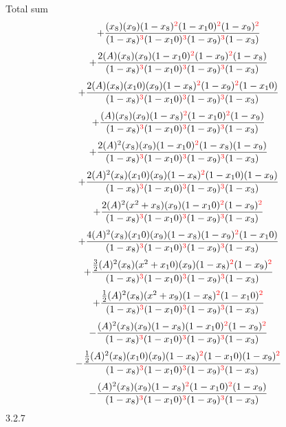 \documentclass{article}
\begin{document}
Total sum
\[+\frac{(x_8)(x_9)(1-x_8)^{\textcolor{red}{2}}(1-x_10)^{\textcolor{red}{2}}(1-x_9)^{\textcolor{red}{2}}}{(1-x_8)^{\textcolor{red}{3}}(1-x_10)^{\textcolor{red}{3}}(1-x_9)^{\textcolor{red}{3}}(1-x_3)}\]\[+\frac{2(A)(x_8)(x_9)(1-x_10)^{\textcolor{red}{2}}(1-x_9)^{\textcolor{red}{2}}(1-x_8)}{(1-x_8)^{\textcolor{red}{3}}(1-x_10)^{\textcolor{red}{3}}(1-x_9)^{\textcolor{red}{3}}(1-x_3)}\]\[+\frac{2(A)(x_8)(x_10)(x_9)(1-x_8)^{\textcolor{red}{2}}(1-x_9)^{\textcolor{red}{2}}(1-x_10)}{(1-x_8)^{\textcolor{red}{3}}(1-x_10)^{\textcolor{red}{3}}(1-x_9)^{\textcolor{red}{3}}(1-x_3)}\]\[+\frac{(A)(x_8)(x_9)(1-x_8)^{\textcolor{red}{2}}(1-x_10)^{\textcolor{red}{2}}(1-x_9)}{(1-x_8)^{\textcolor{red}{3}}(1-x_10)^{\textcolor{red}{3}}(1-x_9)^{\textcolor{red}{3}}(1-x_3)}\]\[+\frac{2(A)^{2}(x_8)(x_9)(1-x_10)^{\textcolor{red}{2}}(1-x_8)(1-x_9)}{(1-x_8)^{\textcolor{red}{3}}(1-x_10)^{\textcolor{red}{3}}(1-x_9)^{\textcolor{red}{3}}(1-x_3)}\]\[+\frac{2(A)^{2}(x_8)(x_10)(x_9)(1-x_8)^{\textcolor{red}{2}}(1-x_10)(1-x_9)}{(1-x_8)^{\textcolor{red}{3}}(1-x_10)^{\textcolor{red}{3}}(1-x_9)^{\textcolor{red}{3}}(1-x_3)}\]\[+\frac{2(A)^{2}(x^{2}+x_8)(x_9)(1-x_10)^{\textcolor{red}{2}}(1-x_9)^{\textcolor{red}{2}}}{(1-x_8)^{\textcolor{red}{3}}(1-x_10)^{\textcolor{red}{3}}(1-x_9)^{\textcolor{red}{3}}(1-x_3)}\]\[+\frac{4(A)^{2}(x_8)(x_10)(x_9)(1-x_8)(1-x_9)^{\textcolor{red}{2}}(1-x_10)}{(1-x_8)^{\textcolor{red}{3}}(1-x_10)^{\textcolor{red}{3}}(1-x_9)^{\textcolor{red}{3}}(1-x_3)}\]\[+\frac{\frac{3}{2}(A)^{2}(x_8)(x^{2}+x_10)(x_9)(1-x_8)^{\textcolor{red}{2}}(1-x_9)^{\textcolor{red}{2}}}{(1-x_8)^{\textcolor{red}{3}}(1-x_10)^{\textcolor{red}{3}}(1-x_9)^{\textcolor{red}{3}}(1-x_3)}\]\[+\frac{\frac{1}{2}(A)^{2}(x_8)(x^{2}+x_9)(1-x_8)^{\textcolor{red}{2}}(1-x_10)^{\textcolor{red}{2}}}{(1-x_8)^{\textcolor{red}{3}}(1-x_10)^{\textcolor{red}{3}}(1-x_9)^{\textcolor{red}{3}}(1-x_3)}\]\[-\frac{(A)^{2}(x_8)(x_9)(1-x_8)(1-x_10)^{\textcolor{red}{2}}(1-x_9)^{\textcolor{red}{2}}}{(1-x_8)^{\textcolor{red}{3}}(1-x_10)^{\textcolor{red}{3}}(1-x_9)^{\textcolor{red}{3}}(1-x_3)}\]\[-\frac{\frac{1}{2}(A)^{2}(x_8)(x_10)(x_9)(1-x_8)^{\textcolor{red}{2}}(1-x_10)(1-x_9)^{\textcolor{red}{2}}}{(1-x_8)^{\textcolor{red}{3}}(1-x_10)^{\textcolor{red}{3}}(1-x_9)^{\textcolor{red}{3}}(1-x_3)}\]\[-\frac{(A)^{2}(x_8)(x_9)(1-x_8)^{\textcolor{red}{2}}(1-x_10)^{\textcolor{red}{2}}(1-x_9)}{(1-x_8)^{\textcolor{red}{3}}(1-x_10)^{\textcolor{red}{3}}(1-x_9)^{\textcolor{red}{3}}(1-x_3)}\]
3.2.7
\end{document}
